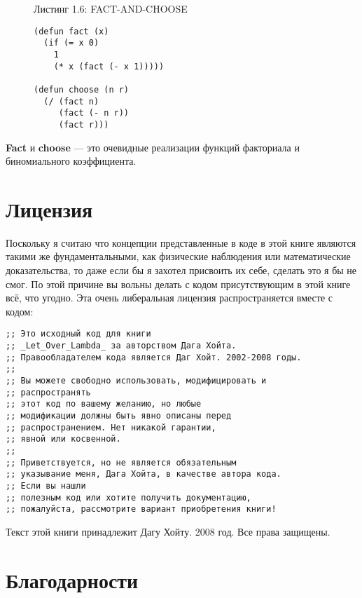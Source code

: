 \begin{figure}Листинг 1.6: FACT-AND-CHOOSE\label{listing_1.6}
\listbegin
\begin{verbatim}
(defun fact (x)
  (if (= x 0)
    1
    (* x (fact (- x 1)))))

(defun choose (n r)
  (/ (fact n)
     (fact (- n r))
     (fact r)))
\end{verbatim}
\listend
\end{figure}

\textbf{Fact} и \textbf{choose} --- это очевидные реализации функций факториала и биномиального коэффициента.

\section{Лицензия}\label{section_license}

Поскольку я считаю что концепции представленные в коде в этой книге являются такими же фундаментальными, как физические наблюдения или математические доказательства, то даже если бы я захотел присвоить их себе, сделать это я бы не смог. По этой причине вы вольны делать с кодом присутствующим в этой книге всё, что угодно. Эта очень либеральная лицензия распространяется вместе с кодом:

\begin{verbatim}
;; Это исходный код для книги
;; _Let_Over_Lambda_ за авторством Дага Хойта.
;; Правообладателем кода является Даг Хойт. 2002-2008 годы.
;;
;; Вы можете свободно использовать, модифицировать и 
;; распространять
;; этот код по вашему желанию, но любые
;; модификации должны быть явно описаны перед
;; распространением. Нет никакой гарантии,
;; явной или косвенной.
;;
;; Приветствуется, но не является обязательным
;; указывание меня, Дага Хойта, в качестве автора кода.
;; Если вы нашли
;; полезным код или хотите получить документацию,
;; пожалуйста, рассмотрите вариант приобретения книги!
\end{verbatim}

Текст этой книги принадлежит Дагу Хойту. 2008 год. Все права защищены.

\section{Благодарности}\label{section_thanks}


